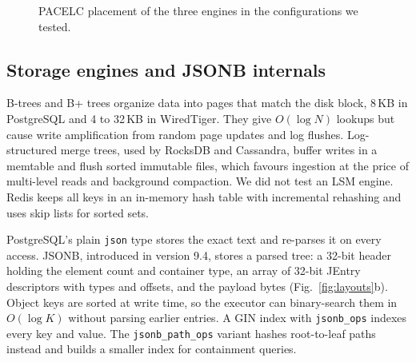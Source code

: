 \documentclass[conference,a4paper]{IEEEtran}
\newcommand{\code}[1]{\texttt{\small #1}}
\begin{document}
\begin{figure}[t]
\centering
{}
\caption{PACELC placement of the three engines in the configurations we tested.}
\label{fig:pacelc}
\end{figure}

\subsection{Storage engines and JSONB internals}
B-trees and B+ trees organize data into pages that match the disk block, 8\,KB in PostgreSQL and 4 to 32\,KB in WiredTiger. They give $O(\log N)$ lookups but cause write amplification from random page updates and log flushes. Log-structured merge trees, used by RocksDB and Cassandra, buffer writes in a memtable and flush sorted immutable files, which favours ingestion at the price of multi-level reads and background compaction. We did not test an LSM engine. Redis keeps all keys in an in-memory hash table with incremental rehashing and uses skip lists for sorted sets.

PostgreSQL's plain \code{json} type stores the exact text and re-parses it on every access. JSONB, introduced in version 9.4, stores a parsed tree: a 32-bit header holding the element count and container type, an array of 32-bit JEntry descriptors with types and offsets, and the payload bytes (Fig.~\ref{fig:layouts}b). Object keys are sorted at write time, so the executor can binary-search them in $O(\log K)$ without parsing earlier entries. A GIN index with \code{jsonb\_ops} indexes every key and value. The \code{jsonb\_path\_ops} variant hashes root-to-leaf paths instead and builds a smaller index for containment queries.
\end{document}
